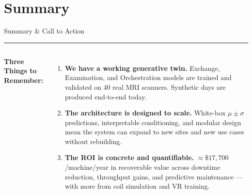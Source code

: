 \documentclass[aspectratio=169,12pt]{beamer}
\newcommand{\tealsep}{\vspace{1pt}\textcolor{SiemensTeal}{\rule{\linewidth}{1pt}}\vspace{4pt}}
\begin{document}
\section{Summary}

\begin{frame}[shrink=8]{Summary \& Call to Action}
\tealsep
\vspace{4pt}

\begin{columns}[T]

\textbf{Three Things to Remember:}
\vspace{6pt}
\begin{enumerate}\setlength\itemsep{8pt}
  \item[\textcolor{SiemensTeal}{\Large\textbf{1}}]
  \textbf{We have a working generative twin.} Exchange, Examination, and Orchestration models are trained and validated on 40 real MRI scanners. Synthetic days are produced end-to-end today.

  \item[\textcolor{SiemensTeal}{\Large\textbf{2}}]
  \textbf{The architecture is designed to scale.} White-box $\mu \pm \sigma$ predictions, interpretable conditioning, and modular design mean the system can expand to new sites and new use cases without rebuilding.

  \item[\textcolor{SiemensTeal}{\Large\textbf{3}}]
  \textbf{The ROI is concrete and quantifiable.} $\approx\$17{,}700$/machine/year in recoverable value across downtime reduction, throughput gains, and predictive maintenance — with more from coil simulation and VR training.
\end{enumerate}


\end{columns}
\end{frame}
\end{document}
